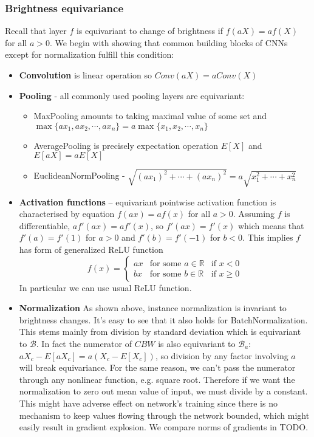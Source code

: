 \subsubsection{Brightness equivariance}
Recall that layer $f$ is equivariant to
change of brightness if $ f(aX) = af(X)$ for all $a>0$.
We begin with showing that common building blocks of CNNs except for
normalization fulfill this condition:
\begin{itemize}
    \item \textbf{Convolution} is linear operation so $\mathit{Conv}(aX) =
        a\mathit{Conv}(X)$
    \item \textbf{Pooling} - all commonly used pooling layers are equivariant:
        \begin{itemize}
            \item MaxPooling amounts to taking maximal value of some set and\\
                $\max\{ax_1,ax_2,\cdots,ax_n\}=a\max\{x_1,x_2,\cdots,x_n\}$
            \item AveragePooling is precisely expectation operation $E[X]$ and
                    $E[aX] = aE[X]$
            \item EuclideanNormPooling -
                $\sqrt{(ax_1)^2+\cdots+(ax_n)^2} = a\sqrt{x_1^2+\cdots+x_n^2}$
        \end{itemize}
    \item \textbf{Activation functions} -- equivariant pointwise activation
        function is characterised by equation $f(ax) = af(x)$ for all $a>0$.
        Assuming $f$ is differentiable, $af'(ax) = af'(x)$, so $f'(ax)=f'(x)$ which
        means that $f'(a)=f'(1)$ for $a>0$ and $f'(b)=f'(-1)$ for $b<0$.
        This implies $f$ has form of generalized ReLU function
        $$f(x)=\left\{
            \begin{array}{lll}
                ax & \mbox{for some } a \in \mathbb{R} & \mbox{if } x<0 \\
                bx & \mbox{for some } b \in \mathbb{R} & \mbox{if } x \geq 0
            \end{array}\right.$$
        In particular we can use usual ReLU function.
    \item \textbf{Normalization} As shown above, instance normalization is
        invariant to brightness changes. It's easy to see that it also holds
        for BatchNormalization. This stems mainly from division by
        standard deviation which is equivariant to $\mathcal{B}$. In fact
        the numerator of $\mathit{CBW}$ is also equivariant to $\mathcal{B}_a$:
        $aX_c-E[aX_c]=a(X_c-E[X_c])$, so division by any factor involving $a$
        will break equivariance. For the same reason, we can't pass the
        numerator through any nonlinear function, e.g. square root.
        Therefore if we want the normalization to zero
        out mean value of input, we must divide by a constant. This might have
        adverse effect on network's training since there is no mechanism to keep
        values flowing through the network bounded, which might easily result in
        gradient explosion. We compare norms of gradients in {\color{red}TODO}.
\end{itemize}
